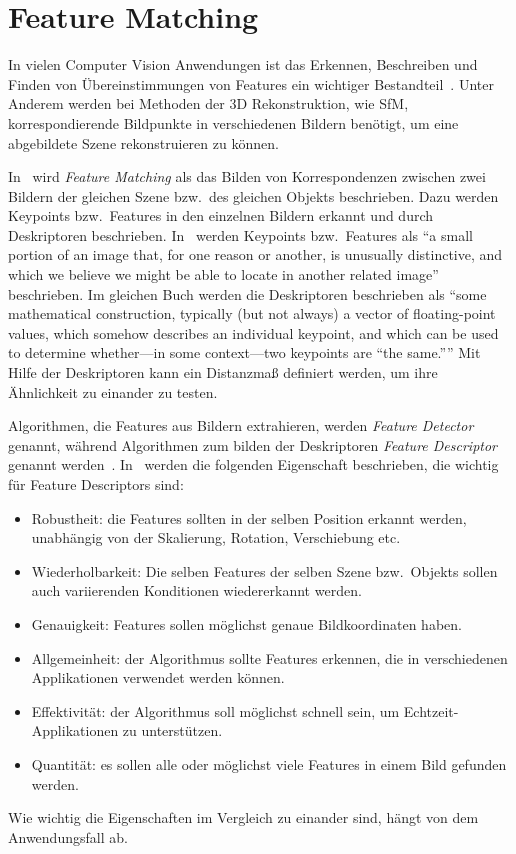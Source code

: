 \section{Feature Matching}
In vielen Computer Vision Anwendungen ist das Erkennen, Beschreiben und Finden von Übereinstimmungen von Features ein wichtiger Bestandteil~\cite{hassaballah_2016}.
Unter Anderem werden bei Methoden der 3D Rekonstruktion, wie SfM, korrespondierende Bildpunkte in verschiedenen Bildern benötigt, um eine abgebildete Szene rekonstruieren zu können.

In~\cite{hassaballah_2016} wird \emph{Feature Matching} als das Bilden von Korrespondenzen zwischen zwei Bildern der gleichen Szene bzw.\ des gleichen Objekts beschrieben.
Dazu werden Keypoints bzw.\ Features in den einzelnen Bildern erkannt und durch Deskriptoren beschrieben.
In~\cite[Kapitel 16]{kaehler_2016} werden Keypoints bzw.\ Features als \enquote{a small portion of an image that, for one reason or another, is unusually distinctive, and which we believe we might be
able to locate in another related image} beschrieben.
Im gleichen Buch werden die Deskriptoren beschrieben als \enquote{some mathematical construction, typically (but not always) a vector of floating-point values, which somehow describes an individual keypoint, and which can be used to determine whether---in some context---two keypoints are ``the same.''}
Mit Hilfe der Deskriptoren kann ein Distanzmaß definiert werden, um ihre Ähnlichkeit zu einander zu testen.

Algorithmen, die Features aus Bildern extrahieren, werden \emph{Feature Detector} genannt, während Algorithmen zum bilden der Deskriptoren \emph{Feature Descriptor} genannt werden~\cite{hassaballah_2016}.
In~\cite{hassaballah_2016} werden die folgenden Eigenschaft beschrieben, die wichtig für Feature Descriptors sind:
\begin{itemize}
    \item Robustheit: die Features sollten in der selben Position erkannt werden, unabhängig von der Skalierung, Rotation, Verschiebung etc.
    \item Wiederholbarkeit: Die selben Features der selben Szene bzw.\ Objekts sollen auch variierenden Konditionen wiedererkannt werden.
    \item Genauigkeit: Features sollen möglichst genaue Bildkoordinaten haben.
    \item Allgemeinheit: der Algorithmus sollte Features erkennen, die in verschiedenen Applikationen verwendet werden können.
    \item Effektivität: der Algorithmus soll möglichst schnell sein, um Echtzeit-Applikationen zu unterstützen. 
    \item Quantität: es sollen alle oder möglichst viele Features in einem Bild gefunden werden.
\end{itemize}
Wie wichtig die Eigenschaften im Vergleich zu einander sind, hängt von dem Anwendungsfall ab.



